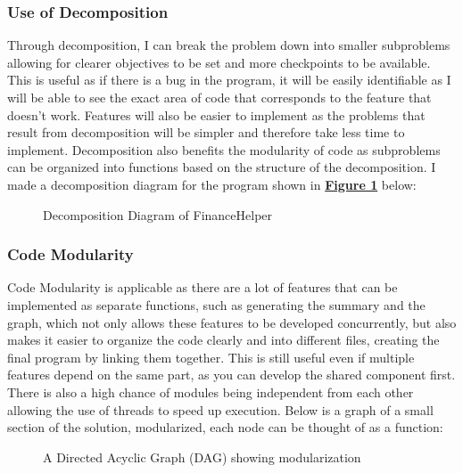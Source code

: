 \documentclass{article}
\newcommand{\jumpTo}[1]{\textcolor{blue}{#1}}
\begin{document}
\subsubsection{Use of Decomposition}
Through decomposition, I can break the problem down into smaller subproblems allowing for clearer objectives to be set and more checkpoints to be available. This is useful as if there is a bug in the program, it will be easily identifiable as I will be able to see the exact area of code that corresponds to the feature that doesn't work. Features will also be easier to implement as the problems that result from decomposition will be simpler and therefore take less time to implement. Decomposition also benefits the modularity of code as subproblems can be organized into functions based on the structure of the decomposition. I made a decomposition diagram for the program shown in \jumpTo{\textbf{\hyperref[fig:FHDecomp]{Figure 1}}} below:

\begin{figure}[H]
    \centering
    
    \caption{Decomposition Diagram of FinanceHelper}
    \label{fig:FHDecomp}
\end{figure}

\subsubsection{Code Modularity}
Code Modularity is applicable as there are a lot of features that can be implemented as separate functions, such as generating the summary and the graph, which not only allows these features to be developed concurrently, but also makes it easier to organize the code clearly and into different files, creating the final program by linking them together. This is still useful even if multiple features depend on the same part, as you can develop the shared component first. There is also a high chance of modules being independent from each other allowing the use of threads to speed up execution. Below is a graph of a small section of the solution, modularized, each node can be thought of as a function:

\begin{figure}[H]
    \centering
    
    \caption{A Directed Acyclic Graph (DAG) showing modularization}
    \label{fig:ModularDAG}
\end{figure}
\end{document}
